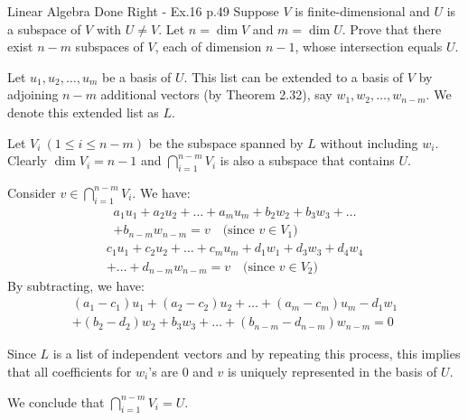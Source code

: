 \begin{problem}{}{}{Linear Algebra Done Right - Ex.16 p.49}
Suppose \(V\) is finite-dimensional and \(U\) is a subspace of \(V\)
with \(U \ne V\). Let \(n = \dim V\) and \(m = \dim U\).
Prove that there exist \(n - m\) subspaces of \(V\), each of dimension
\(n - 1\), whose intersection equals \(U\).
\end{problem}

\begin{solution}
    Let $u_1, u_2, \dots, u_m$ be a basis of $U$. This list can be
    extended to a basis of $V$ by adjoining $n-m$ additional
    vectors (by Theorem 2.32), say $w_1, w_2, \dots, w_{n-m}$.
    We denote this extended list as $L$.

    Let $V_i \ (1 \leq i \leq n-m)$ be the subspace spanned by $L$
    without including $w_i$. Clearly $\dim V_i = n-1$ and
    $\bigcap_{i=1}^{n-m} V_i$ is also a subspace that contains $U$.

    Consider $v \in \bigcap_{i=1}^{n-m} V_i$. We have:
    \begin{align*}
        a_1 u_1 + a_2 u_2 + \dots + a_m u_m + b_2 w_2 + b_3 w_3 + \dots \\
        + b_{n-m} w_{n-m} = v \quad \text{(since } v \in V_1 \text{)}
    \end{align*}
    \begin{align*}
        c_1 u_1 + c_2 u_2 + \dots + c_m u_m + d_1 w_1 + d_3 w_3 + d_4 w_4 \\
        + \dots + d_{n-m} w_{n-m} = v \quad \text{(since } v \in V_2 \text{)}
    \end{align*}
    By subtracting, we have:
    \begin{multline*}
        (a_1 - c_1)u_1 + (a_2 - c_2)u_2 + \dots + (a_m - c_m)u_m - d_1 w_1 \\
        + (b_2 - d_2)w_2 + b_3 w_3 + \dots + (b_{n-m} - d_{n-m})w_{n-m} = 0
    \end{multline*}

    Since $L$ is a list of independent vectors and by repeating this
    process, this implies that all coefficients for $w_i$'s are $0$
    and $v$ is uniquely represented in the basis of $U$.

    We conclude that $\bigcap_{i=1}^{n-m} V_i = U$.
\end{solution}